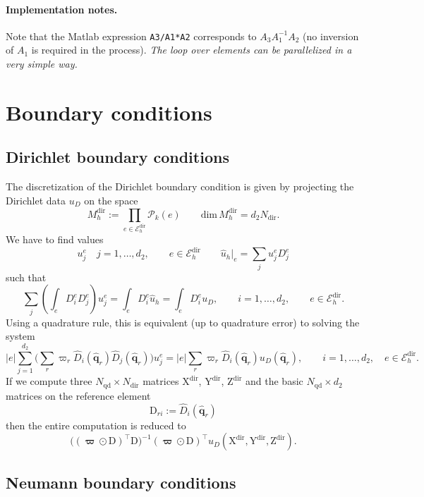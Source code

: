 \documentclass[10pt,english]{article}
\newcommand{\Nnd}{{N_{\mathrm{qd}}}}
\newcommand{\Ndir}{{N_{\mathrm{dir}}}}
\newcommand{\dir}{{\mathrm{dir}}}
\newcommand{\qq}{\widehat{\mathbf q}}
\begin{document}
\paragraph{Implementation notes.} Note that the Matlab expression {\tt A3/A1*A2} corresponds to $A_3  A_1^{-1} A_2$ (no inversion of $A_1$ is required in the process). {\em The loop over elements can be  parallelized in a very simple way.}




\section{Boundary conditions}

\subsection{Dirichlet boundary conditions}\label{sec:6.1}

The discretization of the Dirichlet boundary condition is given by projecting the Dirichlet data $u_D$ on the space
\[
M_h^\dir:=\prod_{e\in \mathcal E_h^{\mathrm{dir}}} \mathcal P_k(e) \qquad \mathrm{dim}\,M_h^\dir=d_2\Ndir.
\]
We have to find values
\[
u_j^e \quad j=1,\ldots,d_2, \qquad e\in \mathcal E_h^{\mathrm{dir}} \qquad \widehat u_h|_e=\sum_j u_j^e D_j^e
\]
such that
\[
\sum_j \left(\int_e D_i^e D_j^e \right)u_{j}^e=\int_e D_i^e \widehat u_h =\int_e D_i^e u_D, \qquad  i=1,\ldots,d_2, \qquad e\in \mathcal E_h^{\mathrm{dir}}.
\]
Using a quadrature rule, this is equivalent (up to quadrature error) to solving the system
\[
|e| \sum_{j=1}^{d_2}\Big( \sum_r \varpi_r \widehat D_i(\qq_r)\widehat D_j(\qq_r)\Big) u_j^e=|e| \sum_r \varpi_r \widehat D_i(\qq_r) u_D(\qq_r), \qquad i=1,\ldots, d_2, \quad e\in \mathcal E_h^{\mathrm{dir}}.
\]
If we compute three $\Nnd\times \Ndir$ matrices $\mathrm X^\dir$, $\mathrm Y^\dir$, $\mathrm Z^\dir$ and the basic $\Nnd\times d_2$ matrices on the reference element
\[
\mathrm D_{ri}:= \widehat D_i(\qq_r)
\]
then the entire computation is reduced to
\[
\big( (\boldsymbol\varpi\odot\mathrm D)^\top\mathrm D\big)^{-1} (\boldsymbol\varpi\odot\mathrm D)^\top u_D(\mathrm X^{\mathrm{dir}},\mathrm Y^{\mathrm{dir}},\mathrm Z^{\mathrm{dir}}).
\]




\subsection{Neumann boundary conditions}
\end{document}
